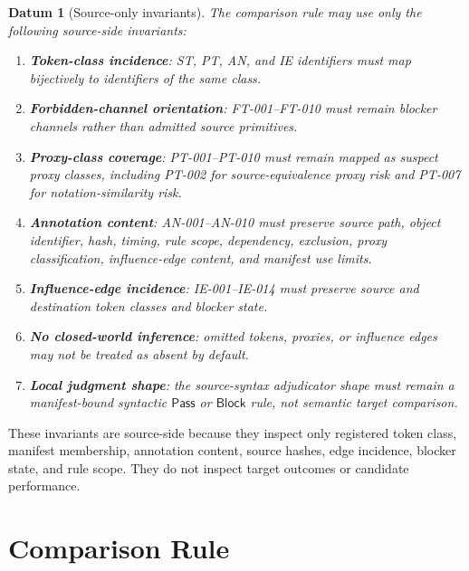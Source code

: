 \documentclass[11pt]{article}
\newcommand{\Pass}{\mathsf{Pass}}
\newcommand{\Block}{\mathsf{Block}}
\newtheorem{datum}{Datum}
\begin{document}
\begin{datum}[Source-only invariants]
The comparison rule may use only the following source-side invariants:
\begin{enumerate}
    \item \textbf{Token-class incidence}: ST, PT, AN, and IE identifiers
    must map bijectively to identifiers of the same class.
    \item \textbf{Forbidden-channel orientation}: FT-001--FT-010 must
    remain blocker channels rather than admitted source primitives.
    \item \textbf{Proxy-class coverage}: PT-001--PT-010 must remain mapped
    as suspect proxy classes, including PT-002 for source-equivalence
    proxy risk and PT-007 for notation-similarity risk.
    \item \textbf{Annotation content}: AN-001--AN-010 must preserve source
    path, object identifier, hash, timing, rule scope, dependency,
    exclusion, proxy classification, influence-edge content, and manifest
    use limits.
    \item \textbf{Influence-edge incidence}: IE-001--IE-014 must preserve
    source and destination token classes and blocker state.
    \item \textbf{No closed-world inference}: omitted tokens, proxies, or
    influence edges may not be treated as absent by default.
    \item \textbf{Local judgment shape}: the source-syntax adjudicator
    shape must remain a manifest-bound syntactic \(\Pass\) or \(\Block\)
    rule, not semantic target comparison.
\end{enumerate}
\end{datum}

These invariants are source-side because they inspect only registered
token class, manifest membership, annotation content, source hashes, edge
incidence, blocker state, and rule scope. They do not inspect target
outcomes or candidate performance.

\section{Comparison Rule}
\end{document}
